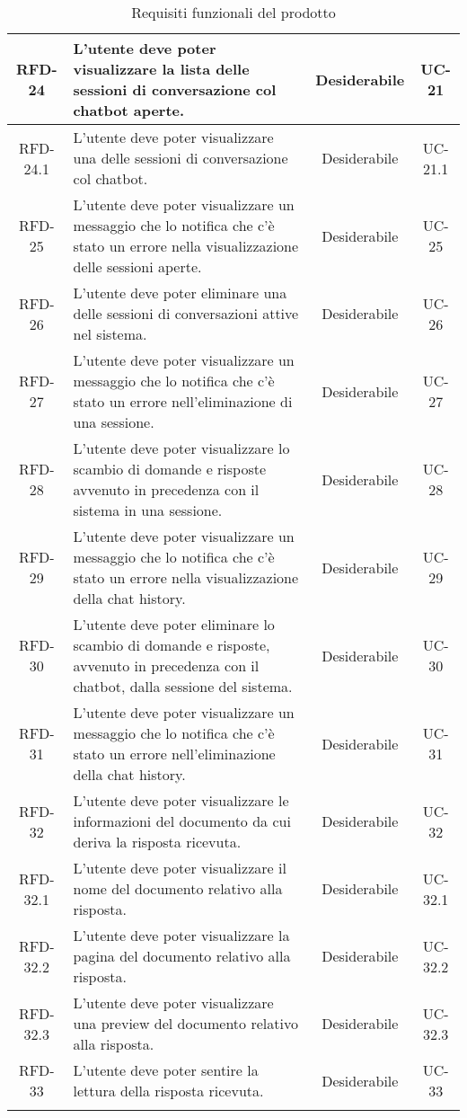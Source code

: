 \begin{xltabular}{\textwidth}{| c | X | c | c |}
    \hline
    RFD-24 & L’utente deve poter visualizzare la lista delle sessioni di conversazione col chatbot aperte. & Desiderabile & UC-21 \\
    \hline
    RFD-24.1 & L’utente deve poter visualizzare una delle sessioni di conversazione col chatbot. & Desiderabile & UC-21.1 \\
    \hline
    RFD-25 & L'utente deve poter visualizzare un messaggio che lo notifica che c'è stato un errore nella visualizzazione delle sessioni aperte. & Desiderabile & UC-25 \\
    \hline
    RFD-26 & L’utente deve poter eliminare una delle sessioni di conversazioni attive nel sistema. & Desiderabile & UC-26 \\
    \hline
    RFD-27 & L'utente deve poter visualizzare un messaggio che lo notifica che c'è stato un errore nell'eliminazione di una sessione. & Desiderabile & UC-27 \\
    \hline
    RFD-28 & L’utente deve poter visualizzare lo scambio di domande e risposte avvenuto in precedenza con il sistema in una sessione. & Desiderabile & UC-28 \\
    \hline
    RFD-29 & L'utente deve poter visualizzare un messaggio che lo notifica che c'è stato un errore nella visualizzazione della chat history. & Desiderabile & UC-29 \\
    \hline
    RFD-30 & L’utente deve poter eliminare lo scambio di domande e risposte, avvenuto in precedenza con il chatbot, dalla sessione del sistema. & Desiderabile & UC-30 \\
    \hline
    RFD-31 & L'utente deve poter visualizzare un messaggio che lo notifica che c'è stato un errore nell'eliminazione della chat history. & Desiderabile & UC-31 \\
    \hline
    RFD-32 & L’utente deve poter visualizzare le informazioni del documento da cui deriva la risposta ricevuta. & Desiderabile & UC-32 \\
    \hline
    RFD-32.1 & L’utente deve poter visualizzare il nome del documento relativo alla risposta. & Desiderabile & UC-32.1 \\
    \hline
    RFD-32.2 & L'utente deve poter visualizzare la pagina del documento relativo alla risposta. & Desiderabile & UC-32.2 \\
    \hline
    RFD-32.3 & L’utente deve poter visualizzare una preview del documento relativo alla risposta. & Desiderabile & UC-32.3 \\
    \hline
    RFD-33 & L’utente deve poter sentire la lettura della risposta ricevuta. & Desiderabile & UC-33 \\
    \hline
     \caption{Requisiti funzionali del prodotto}
    \label{tab:reqfun}
\end{xltabular}
\endgroup

